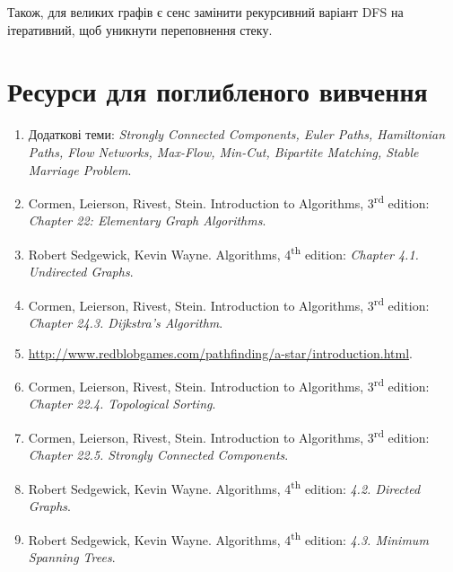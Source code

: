 \documentclass[12pt,a4paper]{report}
\begin{document}
Також, для великих графів є сенс замінити рекурсивний варіант DFS на ітеративний, щоб уникнути переповнення стеку.





\section*{Ресурси для поглибленого вивчення}
\begin{enumerate}
    \item Додаткові теми: {\itshape Strongly Connected Components, Euler Paths, Hamiltonian Paths, Flow Networks, Max-Flow, Min-Cut, Bipartite Matching, Stable Marriage Problem}.
    \item Cormen, Leierson, Rivest, Stein. Introduction to Algorithms, 3\textsuperscript{rd} edition: {\itshape Chapter 22: Elementary Graph Algorithms}.
    \item Robert Sedgewick, Kevin Wayne. Algorithms, 4\textsuperscript{th} edition: {\itshape Chapter 4.1. Undirected Graphs}.
    \item Cormen, Leierson, Rivest, Stein. Introduction to Algorithms, 3\textsuperscript{rd} edition: {\itshape Chapter 24.3. Dijkstra’s Algorithm}.
    \item \href{http://www.redblobgames.com/pathfinding/a-star/introduction.html}{http://www.redblobgames.com/pathfinding/a-star/introduction.html}.
    \item Cormen, Leierson, Rivest, Stein. Introduction to Algorithms, 3\textsuperscript{rd} edition: {\itshape Chapter 22.4. Topological Sorting}.
    \item Cormen, Leierson, Rivest, Stein. Introduction to Algorithms, 3\textsuperscript{rd} edition: {\itshape Chapter 22.5. Strongly Connected Components}.
    \item Robert Sedgewick, Kevin Wayne. Algorithms, 4\textsuperscript{th} edition: {\itshape 4.2. Directed Graphs}.
    \item Robert Sedgewick, Kevin Wayne. Algorithms, 4\textsuperscript{th} edition: {\itshape 4.3. Minimum Spanning Trees}.

\end{enumerate}
\end{document}

